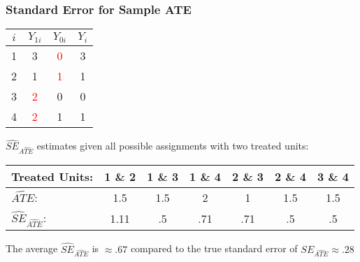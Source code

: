 \documentclass{beamer}
\numberwithin{equation}{section}
\begin{document}
\begin{frame}
  \frametitle{Standard Error for Sample ATE}
\small
\begin{center}
\begin{tabular}{cccc}
\multicolumn{1}{p{2cm}}{\center $i$} &   \multicolumn{1}{p{1cm}}{\center $Y_{1i}$} & \multicolumn{1}{p{1cm}}{\center $Y_{0i}$}&    \multicolumn{1}{p{1cm}}{\center $Y_{i}$}  \\
\hline
\rowcolor{gray!10}        1 &          3 &        \textcolor{red}{0} &          3   \\
\rowcolor{gray!10}         2 &         1 &       \textcolor{red}{1} &          1    \\
\rowcolor{gray!30}         3 &          \textcolor{red}{2} &         0 &          0   \\
\rowcolor{gray!30}         4 &          \textcolor{red}{2} &         1 &          1  \\
\hline
\end{tabular}
\end{center}\vspace{.05in}
$\widehat{ SE}_{\widehat{ATE}}$ estimates given all possible assignments with two treated units:\\
\begin{center}
\begin{tabular}{lcccccc}
\hline
\hline
    Treated Units: & 1 \& 2 & 1 \& 3 & 1 \& 4 & 2 \& 3 & 2 \& 4 & 3 \& 4 \\
    \hline
   $\widehat{ATE}$: & 1.5 & 1.5 & 2  & 1  & 1.5 & 1.5 \\
   $\widehat{ SE}_{\widehat{ATE}}$: & 1.11 & .5 & .71  & .71  & .5 & .5 \\
\hline \hline
\end{tabular}
\end{center}\vspace{.05in}
The average $\widehat{ SE}_{\widehat{ATE}}$ is $\approx .67$ compared to the true standard error of  $SE_{\widehat{ATE}}\approx .28$
\end{frame}
\end{document}
